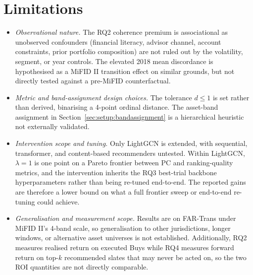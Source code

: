 \section{Limitations}
\label{sec:limitations}

\begin{itemize}
    \item \textit{Observational nature.} The RQ2 coherence premium is associational as unobserved confounders (financial literacy, advisor channel, account constraints, prior portfolio composition) are not ruled out by the volatility, segment, or year controls. The elevated 2018 mean discordance is hypothesised as a MiFID II transition effect on similar grounds, but not directly tested against a pre-MiFID counterfactual.
    \item \textit{Metric and band-assignment design choices.} The tolerance $d \leq 1$ is set rather than derived, binarising a 4-point ordinal distance. The asset-band assignment in Section~\ref{sec:setup:bandassignment} is a hierarchical heuristic not externally validated.
    \item \textit{Intervention scope and tuning.} Only LightGCN is extended, with sequential, transformer, and content-based recommenders untested. Within LightGCN, $\lambda = 1$ is one point on a Pareto frontier between PC and ranking-quality metrics, and the intervention inherits the RQ3 best-trial backbone hyperparameters rather than being re-tuned end-to-end. The reported gains are therefore a lower bound on what a full frontier sweep or end-to-end re-tuning could achieve.
    \item \textit{Generalisation and measurement scope.} Results are on FAR-Trans under MiFID II's 4-band scale, so generalisation to other jurisdictions, longer windows, or alternative asset universes is not established. Additionally, RQ2 measures realised return on executed Buys while RQ4 measures forward return on top-$k$ recommended slates that may never be acted on, so the two ROI quantities are not directly comparable.
\end{itemize}
